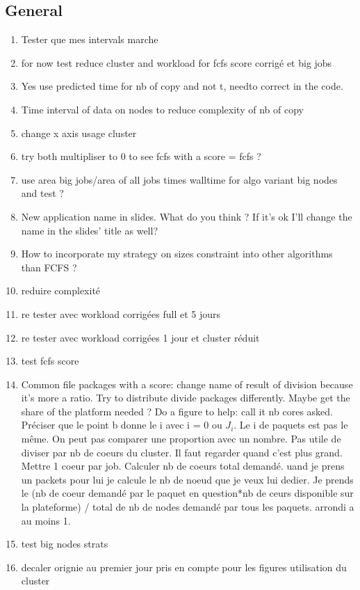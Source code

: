 \documentclass[a4paper]{article}
\begin{document}
	\subsection{General}
		\begin{enumerate}
			\item Tester que mes intervals marche
			\item for now test reduce cluster and workload for fcfs score corrigé et big jobs
			\item Yes use predicted time for nb of copy and not t, needto correct in the code.
			\item Time interval of data on nodes to reduce complexity of nb of copy
			\item change x axis usage cluster
			\item try both multipliser to 0 to see fcfs with a score = fcfs ?
			\item use area big jobs/area of all jobs times walltime for algo variant big nodes and test ?
			\item New application name in slides. What do you think ? If it's ok I'll change the name in the slides' title as well?
			\item How to incorporate my strategy on sizes constraint into other algorithms than FCFS ?
			\item reduire complexité
			\item re tester avec workload corrigées full et 5 jours
			\item re tester avec workload corrigées 1 jour et cluster réduit
			\item test fcfs score
			\item Common file packages with a score: change name of result of division because it's more a ratio. Try to distribute divide packages differently. Maybe get the share of the platform needed ? Do a figure to help: call it nb cores asked. Préciser que le point b donne le i avec i = 0 ou $J_i$. Le i de paquets est pas le même. On peut pas comparer une proportion avec un nombre. Pas utile de diviser par nb de coeurs du cluster. Il faut regarder quand c'est plus grand. Mettre 1 coeur par job. Calculer nb de coeurs total demandé. uand je prens un packets pour lui je calcule le nb de noeud que je veux lui dedier. Je prends le (nb de coeur demandé par le paquet en question*nb de ceurs disponible sur la plateforme) / total de nb de nodes demandé par tous les paquets. arrondi a au moins 1.
			\item test big nodes strats
			\item decaler orignie au premier jour pris en compte pour les figures utilisation du cluster

\end{enumerate}
\end{document}
